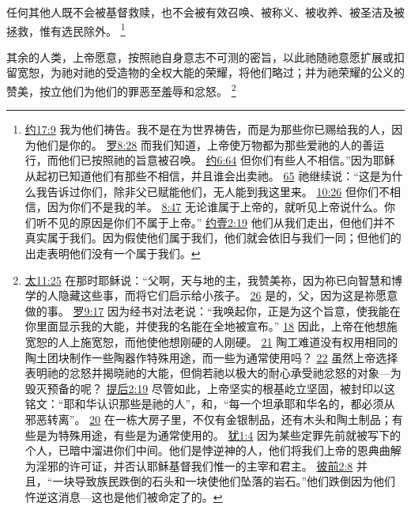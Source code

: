 \documentclass[12pt, a4paper, oneside]{ctexart}
\newcounter{parnum}[section]
\newcommand{\N}{%
   \noindent\refstepcounter{parnum}%
    \makebox[\parindent][l]{\textbf{\arabic{parnum}.}}}
\begin{document}
	任何其他人既不会被基督救赎，也不会被有效召唤、被称义、被收养、被圣洁及被拯救，惟有选民除外。
	\footnote {
		\href{https://biblehub.com/john/17-9.htm}{约17:9} 我为他们祷告。我不是在为世界祷告，而是为那些你已赐给我的人，因为他们是你的。
		\href{https://biblehub.com/romans/8-28.htm}{罗8:28} 而我们知道，上帝使万物都为那些爱祂的人的善运行，而他们已按照祂的旨意被召唤。
		\href{https://biblehub.com/john/6-64.htm}{约6:64} 但你们有些人不相信。”因为耶稣从起初已知道他们有那些不相信，并且谁会出卖祂。
		\href{https://biblehub.com/john/6-65.htm}{65} 祂继续说：“这是为什么我告诉过你们，除非父已赋能他们，无人能到我这里来。
		\href{https://biblehub.com/john/10-26.htm}{10:26} 但你们不相信，因为你们不是我的羊。
		\href{https://biblehub.com/john/8-47.htm}{8:47} 无论谁属于上帝的，就听见上帝说什么。你们听不见的原因是你们不属于上帝。”
		\href{https://biblehub.com/1_john/2-19.htm}{约壹2:19} 他们从我们走出，但他们并不真实属于我们。因为假使他们属于我们，他们就会依旧与我们一同；但他们的出走表明他们没有一个属于我们。
	}

\N 其余的人类，上帝愿意，按照祂自身意志不可测的密旨，以此祂随祂意愿扩展或扣留宽恕，为祂对祂的受造物的全权大能的荣耀，将他们略过；并为祂荣耀的公义的赞美，按立他们为他们的罪恶至羞辱和忿怒。
	\footnote {
		\href{https://biblehub.com/matthew/11-25.htm}{太11:25} 在那时耶稣说：“父啊，天与地的主，我赞美祢，因为祢已向智慧和博学的人隐藏这些事，而将它们启示给小孩子。
		\href{https://biblehub.com/matthew/11-26.htm}{26} 是的，父，因为这是祢愿意做的事。
		\href{https://biblehub.com/romans/9-17.htm}{罗9:17} 因为经书对法老说：“我唤起你，正是为这个旨意，使我能在你里面显示我的大能，并使我的名能在全地被宣布。”
		\href{https://biblehub.com/romans/9-18.htm}{18} 因此，上帝在他想施宽恕的人上施宽恕，而他使他想刚硬的人刚硬。
		\href{https://biblehub.com/romans/9-21.htm}{21} 陶工难道没有权用相同的陶土团块制作一些陶器作特殊用途，而一些为通常使用吗？
		\href{https://biblehub.com/romans/9-22.htm}{22} 虽然上帝选择表明祂的忿怒并揭晓祂的大能，但倘若祂以极大的耐心承受祂忿怒的对象---为毁灭预备的呢？
		\href{https://biblehub.com/2_timothy/2-19.htm}{提后2:19} 尽管如此，上帝坚实的根基屹立坚固，被封印以这铭文：“耶和华认识那些是祂的人”，和，“每一个坦承耶和华名的，都必须从邪恶转离”。
		\href{https://biblehub.com/2_timothy/2-20.htm}{20} 在一栋大房子里，不仅有金银制品，还有木头和陶土制品；有些是为特殊用途，有些是为通常使用的。
		\href{https://biblehub.com/jude/1-4.htm}{犹1:4} 因为某些定罪先前就被写下的个人，已暗中溜进你们中间。他们是悖逆神的人，他们将我们上帝的恩典曲解为淫邪的许可证，并否认耶稣基督我们惟一的主宰和君主。
		\href{https://biblehub.com/1_peter/2-8.htm}{彼前2:8} 并且，“一块导致族民跌倒的石头和一块使他们坠落的岩石。”他们跌倒因为他们忤逆这消息---这也是他们被命定了的。
	}
\end{document}
